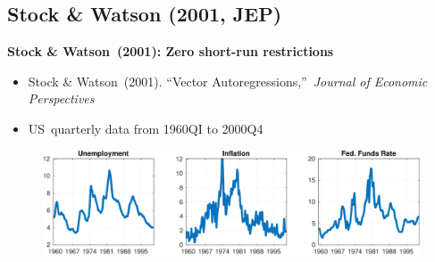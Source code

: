 \documentclass[10pt,english,t,aspectratio=169,ignorenonframetext]{beamer}
\begin{document}

\subsection{Stock \& Watson (2001, JEP)}

\begin{frame}
\vspace{3cm} \color{title}%
\bigskip

\color{note}
\end{frame}


\begin{frame}
{\textbf{Stock \& Watson\ (2001): Zero short-run restrictions}}\bigskip

\begin{itemize}
\item Stock \& Watson\ (2001). \textquotedblleft Vector
Autoregressions,\textquotedblright\ \textit{Journal of Economic Perspectives}%
\bigskip

\item US\ quarterly data from 1960QI to 2000Q4
\end{itemize}

\begin{figure}[h]
\centering\includegraphics[width=.85\textwidth]{SW_DATA.pdf}
\end{figure}
\end{frame}

\end{document}
